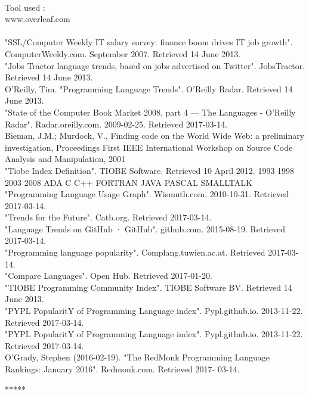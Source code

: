 \documentclass[a4paper, 12pt]{report}
\begin{document}
\\
Tool used :
\\www.overleaf.com
\\
\\
[1] "SSL/Computer Weekly IT salary survey: finance boom drives IT job growth". ComputerWeekly.com. September 2007. Retrieved 14
June 2013.
\\[2] "Jobs Tractor language trends, based on jobs advertised on Twitter". JobsTractor. Retrieved 14 June 2013.
\\[3] O'Reilly, Tim. "Programming Language Trends". O'Reilly Radar. Retrieved 14 June 2013.
\\[4] "State of the Computer Book Market 2008, part 4 — The Languages - O'Reilly Radar". Radar.oreilly.com. 2009-02-25.
Retrieved 2017-03-14.
\\[5] Bieman, J.M.; Murdock, V., Finding code on the World Wide Web: a preliminary investigation, Proceedings First IEEE International
Workshop on Source Code Analysis and Manipulation, 2001
\\[6] "Tiobe Index Definition". TIOBE Software. Retrieved 10 April 2012.
1993 1998 2003 2008
ADA C C++
FORTRAN JAVA PASCAL
SMALLTALK
\\[7] "Programming Language Usage Graph". Wismuth.com. 2010-10-31. Retrieved 2017-03-14.
\\[8] "Trends for the Future". Catb.org. Retrieved 2017-03-14.
\\[9] "Language Trends on GitHub · GitHub". github.com. 2015-08-19. Retrieved 2017-03-14.
\\[10] "Programming language popularity". Complang.tuwien.ac.at. Retrieved 2017-03-14.
\\[11] "Compare Languages". Open Hub. Retrieved 2017-01-20.
\\[12] "TIOBE Programming Community Index". TIOBE Software BV. Retrieved 14 June 2013.
\\[13] "PYPL PopularitY of Programming Language index". Pypl.github.io. 2013-11-22. Retrieved 2017-03-14.
\\[14] "PYPL PopularitY of Programming Language index". Pypl.github.io. 2013-11-22. Retrieved 2017-03-14.
\\[15] O'Grady, Stephen (2016-02-19). "The RedMonk Programming Language Rankings: January 2016". Redmonk.com. Retrieved 2017-
03-14.\\
\begin{center}
    *****
\end{center}
\end{document}
